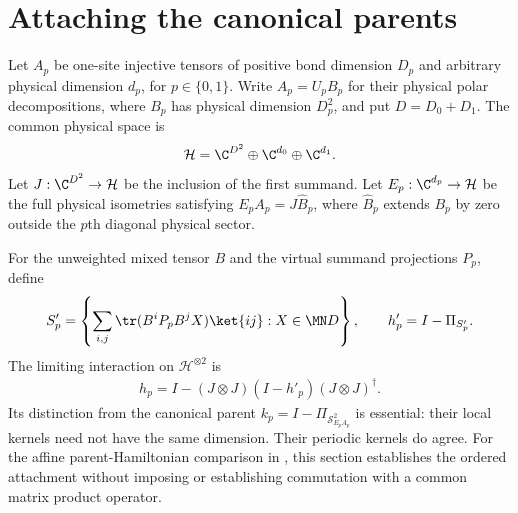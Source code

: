 
\section{Attaching the canonical parents}
\label{sec:mpo_endpoint_parent_attachment}

Let $A_p$ be one-site injective tensors of positive bond dimension $D_p$
and arbitrary physical dimension $d_p$, for $p\in\{0,1\}$. Write
$A_p=U_pB_p$ for their physical polar decompositions, where $B_p$ has
physical dimension $D_p^2$, and put $D=D_0+D_1$. The common physical
space is
\begin{align}
    \mathcal H=\C^{D^2}\oplus\C^{d_0}\oplus\C^{d_1}.
\end{align}
Let $J:\C^{D^2}\to\mathcal H$ be the inclusion of the first summand.
Let $E_p:\C^{d_p}\to\mathcal H$ be the full physical isometries
satisfying $E_pA_p=J\widehat B_p$, where $\widehat B_p$ extends $B_p$
by zero outside the $p$th diagonal physical sector.

For the unweighted mixed tensor $B$ and the virtual summand projections
$P_p$, define
\begin{align}
    S'_p=\left\{\sum_{i,j}\tr(B^iP_pB^jX)\ket{ij}:
    X\in\MN D\right\},
    \qquad h'_p=I-\Pi_{S'_p}.
\end{align}
The limiting interaction on $\mathcal H^{\otimes2}$ is
\begin{align}
    h_p=I-(J\otimes J)(I-h'_p)(J\otimes J)^\dagger.
\end{align}
Its distinction from the canonical parent
$k_p=I-\Pi_{\mathcal S^2_{E_pA_p}}$ is essential: their local kernels
need not have the same dimension. Their periodic kernels do agree.
For the affine parent-Hamiltonian comparison in
\cite[Section~5]{GarreRubio2023MPOSym}, this section establishes the
ordered attachment without imposing or establishing commutation with a
common matrix product operator.

